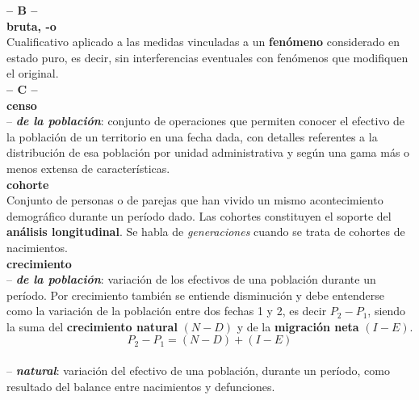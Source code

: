 \begin{multicols}{2}
\noindent\textbf{\huge{-- B --}}\\

\noindent \textbf{\Large{bruta, -o}}\\

\vspace{-0.3cm}
Cualificativo aplicado a las medidas vinculadas a un \textbf{fenómeno} considerado en estado puro, es decir, sin interferencias eventuales con fenómenos que modifiquen el original.\\

\noindent\textbf{\huge{-- C --}}\\

\noindent \textbf{\Large{censo}}\\

\vspace{-0.3cm}
-- \textbf{\textit{de la poblaci\'on}}: conjunto de operaciones que permiten conocer el efectivo de la poblaci\'on de un territorio en una fecha dada, con detalles referentes a la distribuci\'on de esa poblaci\'on por unidad administrativa y seg\'un una gama m\'as o menos extensa de caracter\'isticas.\\

\noindent \textbf{\Large{cohorte}}\\

\vspace{-0.3cm}
Conjunto de personas o de parejas que han vivido un mismo acontecimiento demogr\'afico durante un per\'iodo dado. Las cohortes constituyen el soporte del \textbf{an\'alisis longitudinal}. Se habla de \textit{generaciones} cuando se trata de cohortes de nacimientos.\\

\noindent \textbf{\Large{crecimiento}}\\

\vspace{-0.3cm}
-- \textbf{\textit{de la poblaci\'on}}: variaci\'on de los efectivos de una poblaci\'on durante un per\'iodo. Por crecimiento tambi\'en se entiende disminuci\'on y debe entenderse como la variaci\'on de la poblaci\'on entre dos fechas 1 y 2, es decir $P_{2}-P_{1}$, siendo la suma del \textbf{crecimiento natural} $(N-D)$ y de la \textbf{migraci\'on neta} $(I-E)$. $$P_{2}-P_{1}=(N-D)+(I-E)$$\\

\vspace{-0.9cm}
-- \textbf{\textit{natural}}: variaci\'on del efectivo de una poblaci\'on, durante un per\'iodo, como resultado del balance entre nacimientos y defunciones.\\


\end{multicols}
